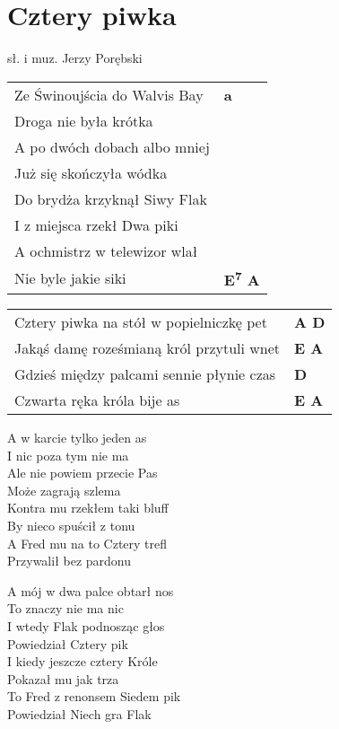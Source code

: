 \section{Cztery piwka}

sł. i muz. Jerzy Porębski\\

\vspace{2em}
\begin{tabular}{@{}p{10cm}@{}l@{}}
Ze Świnoujścia do Walvis Bay & \bfseries a\\
Droga nie była krótka \\
A po dwóch dobach albo mniej \\
Już się skończyła wódka \\
Do brydża krzyknął Siwy Flak \\
I z miejsca rzekł Dwa piki \\
A ochmistrz w telewizor wlał \\
Nie byle jakie siki & \bfseries E\textsuperscript{7} A\\
\end{tabular}

\begin{tabular}{@{}p{10cm}@{}l@{}}
Cztery piwka na stół w popielniczkę pet & \bfseries A D\\
Jakąś damę roześmianą król przytuli wnet & \bfseries E A\\
Gdzieś między palcami sennie płynie czas & \bfseries D\\
Czwarta ręka króla bije as & \bfseries E A\\
\end{tabular}

\vspace{1em}
A w karcie tylko jeden as \\
I nic poza tym nie ma \\
Ale nie powiem przecie Pas \\
Może zagrają szlema \\
Kontra mu rzekłem taki bluff \\
By nieco spuścił z tonu \\
A Fred mu na to Cztery trefl \\
Przywalił bez pardonu \\
\newpage

A mój w dwa palce obtarł nos \\
To znaczy nie ma nic \\
I wtedy Flak podnosząc głos \\
Powiedział Cztery pik \\
I kiedy jeszcze cztery Króle \\
Pokazał mu jak trza \\
To Fred z renonsem Siedem pik \\
Powiedział Niech gra Flak \\

